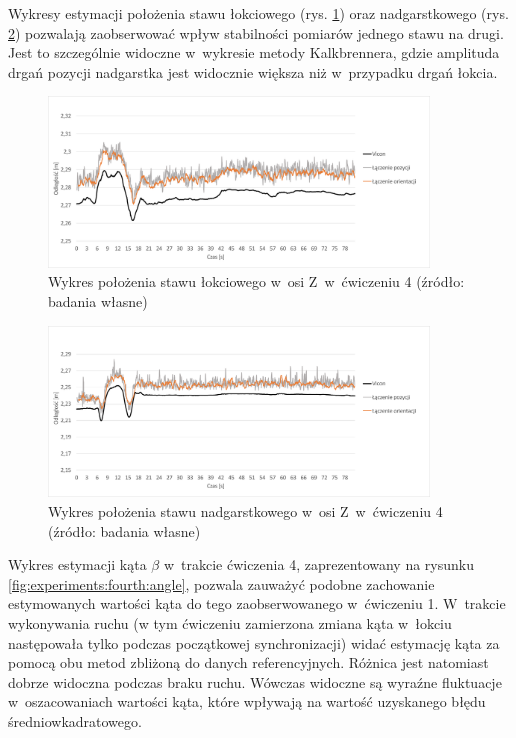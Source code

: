 Wykresy estymacji położenia stawu łokciowego (rys. \ref{fig:experiments:four:elbowZ}) oraz nadgarstkowego (rys. \ref{fig:experiments:four:wristZ}) pozwalają zaobserwować wpływ stabilności pomiarów jednego stawu na drugi. Jest to szczególnie widoczne w~wykresie metody Kalkbrennera, gdzie amplituda drgań pozycji nadgarstka jest widocznie większa niż w~przypadku drgań łokcia. 
					
\begin{figure}[!htb]
	\centering	
		\includegraphics[width=0.9\textwidth]{images/400/3.png}		
		\caption[Wykres położenia stawu łokciowego w~osi Z~w~ćwiczeniu 4]{Wykres położenia stawu łokciowego w~osi Z~w~ćwiczeniu 4 (źródło: badania własne)}
		\label{fig:experiments:four:elbowZ}
\end{figure}
\begin{figure}[!htb]
	\centering
		\includegraphics[width=0.9\textwidth]{images/400/6.png}		
		\caption[Wykres położenia stawu nadgarstkowego w~osi Z~w~ćwiczeniu 4]{Wykres położenia stawu nadgarstkowego w~osi Z~w~ćwiczeniu 4 (źródło: badania własne)}	
		\label{fig:experiments:four:wristZ}
\end{figure}
		
Wykres estymacji kąta $\beta$ w~trakcie ćwiczenia 4, zaprezentowany na rysunku \ref{fig:experiments:fourth:angle}, pozwala zauważyć podobne zachowanie estymowanych wartości kąta do tego zaobserwowanego w~ćwiczeniu 1. W~trakcie wykonywania ruchu (w tym ćwiczeniu zamierzona zmiana kąta w~łokciu następowała tylko podczas początkowej synchronizacji) widać estymację kąta za pomocą obu metod zbliżoną do danych referencyjnych. Różnica jest natomiast dobrze widoczna podczas braku ruchu. Wówczas widoczne są wyraźne fluktuacje w~oszacowaniach wartości kąta, które wpływają na wartość uzyskanego błędu średniowkadratowego.
			
